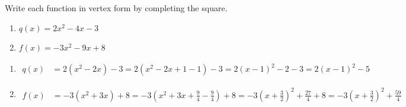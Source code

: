 \documentclass{ximera}
\begin{document}
\begin{problem}
Write each function in vertex form by completing the square.
\begin{enumerate}
  \item[(a)] $q(x) = 2x^2 - 4x - 3$
  \medskip
  \item[(b)] $f(x) = -3x^2 - 9x + 8$
\end{enumerate}

\begin{solution}
\begin{enumerate}
  \item[(a)]
  \begin{align*}
    q(x) &= 2(x^2-2x) - 3 = 2(x^2-2x+1-1)-3 = 2(x-1)^2 - 2 - 3 = 2(x-1)^2-5
  \end{align*}

  \item[(b)]
  \begin{align*}
    f(x) &= -3\!\left(x^2+3x\right)+8 = -3\!\left(x^2+3x+\tfrac{9}{4}-\tfrac{9}{4}\right)+8 = -3\!\left(x+\tfrac{3}{2}\right)^2 + \tfrac{27}{4}+8 = -3\!\left(x+\tfrac{3}{2}\right)^2+\tfrac{59}{4}
  \end{align*}
\end{enumerate}
\end{solution}
\end{problem}
\end{document}
